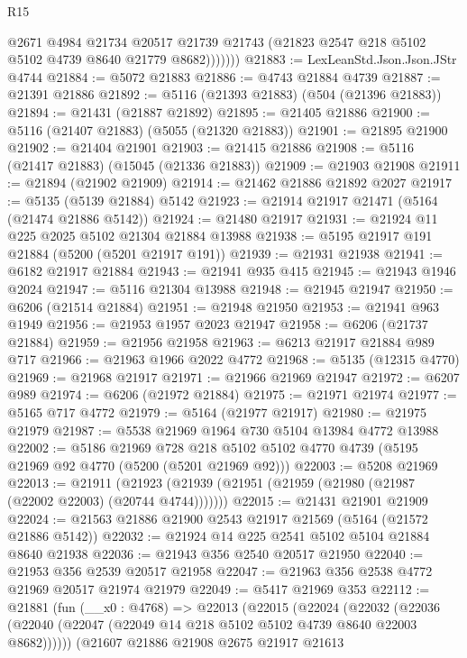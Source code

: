 \begin{lexlean}{R15}
\begin{coremodule}
{{{{{{{{{{{                @2671
                @4984
                @21734
                @20517
                @21739
                @21743
                (@21823 @2547 @218 @5102 @5102 @4739 @8640 @21779 @8682)))))))
@21883 := LexLeanStd.Json.Json.JStr @4744
@21884 := @5072 @21883
@21886 := @4743 @21884 @4739
@21887 := @21391 @21886
@21892 := @5116 (@21393 @21883) (@504 (@21396 @21883))
@21894 := @21431 (@21887 @21892)
@21895 := @21405 @21886
@21900 := @5116 (@21407 @21883) (@5055 (@21320 @21883))
@21901 := @21895 @21900
@21902 := @21404 @21901
@21903 := @21415 @21886
@21908 := @5116 (@21417 @21883) (@15045 (@21336 @21883))
@21909 := @21903 @21908
@21911 := @21894 (@21902 @21909)
@21914 := @21462 @21886 @21892 @2027
@21917 := @5135 (@5139 @21884) @5142
@21923 := @21914 @21917 @21471 (@5164 (@21474 @21886 @5142))
@21924 := @21480 @21917
@21931 := @21924 @11 @225 @2025 @5102 @21304 @21884 @13988
@21938 := @5195 @21917 @191 @21884 (@5200 (@5201 @21917 @191))
@21939 := @21931 @21938
@21941 := @6182 @21917 @21884
@21943 := @21941 @935 @415
@21945 := @21943 @1946 @2024
@21947 := @5116 @21304 @13988
@21948 := @21945 @21947
@21950 := @6206 (@21514 @21884)
@21951 := @21948 @21950
@21953 := @21941 @963 @1949
@21956 := @21953 @1957 @2023 @21947
@21958 := @6206 (@21737 @21884)
@21959 := @21956 @21958
@21963 := @6213 @21917 @21884 @989 @717
@21966 := @21963 @1966 @2022 @4772
@21968 := @5135 (@12315 @4770)
@21969 := @21968 @21917
@21971 := @21966 @21969 @21947
@21972 := @6207 @989
@21974 := @6206 (@21972 @21884)
@21975 := @21971 @21974
@21977 := @5165 @717 @4772
@21979 := @5164 (@21977 @21917)
@21980 := @21975 @21979
@21987 := @5538 @21969 @1964 @730 @5104 @13984 @4772 @13988
@22002 := @5186
    @21969
    @728
    @218
    @5102
    @5102
    @4770
    @4739
    (@5195 @21969 @92 @4770 (@5200 (@5201 @21969 @92)))
@22003 := @5208 @21969
@22013 := @21911
    (@21923 (@21939 (@21951 (@21959 (@21980 (@21987 (@22002 @22003) (@20744 @4744)))))))
@22015 := @21431 @21901 @21909
@22024 := @21563 @21886 @21900 @2543 @21917 @21569 (@5164 (@21572 @21886 @5142))
@22032 := @21924 @14 @225 @2541 @5102 @5104 @21884 @8640 @21938
@22036 := @21943 @356 @2540 @20517 @21950
@22040 := @21953 @356 @2539 @20517 @21958
@22047 := @21963 @356 @2538 @4772 @21969 @20517 @21974 @21979
@22049 := @5417 @21969 @353
@22112 := @21881
    (fun (__x0 : @4768) =>
    @22013
      (@22015
        (@22024
          (@22032
            (@22036 (@22040 (@22047 (@22049 @14 @218 @5102 @5102 @4739 @8640 @22003 @8682))))))
        (@21607
          @21886
          @21908
          @2675
          @21917
          @21613
}}}}}}}}}}}
\end{coremodule}
\end{lexlean}
